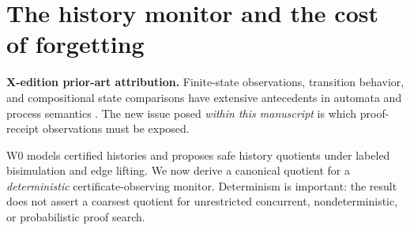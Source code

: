 \documentclass[11pt,letterpaper]{article}
\newcommand{\PriorArtNote}[1]{%
\par\smallskip\noindent\begin{minipage}{\linewidth}\small\color{black!85}%
\textbf{X-edition prior-art attribution.} #1\end{minipage}\par\smallskip}
\begin{document}
\section{The history monitor and the cost of forgetting}
\PriorArtNote{Finite-state observations, transition behavior, and compositional state comparisons have extensive antecedents in automata and process semantics \cite{nerode,milner}. The new issue posed \emph{within this manuscript} is which proof-receipt observations must be exposed.}
W0 models certified histories and proposes safe history quotients under labeled bisimulation and edge lifting. We now derive a canonical quotient for a \emph{deterministic} certificate-observing monitor. Determinism is important: the result does not assert a coarsest quotient for unrestricted concurrent, nondeterministic, or probabilistic proof search.
\end{document}
